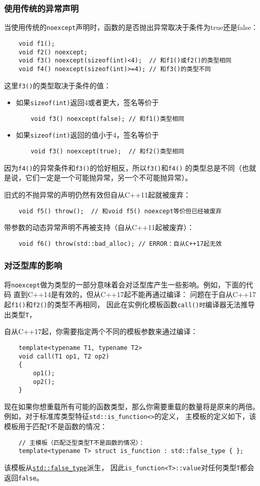 \subsubsection{使用传统的异常声明}
当使用传统的\texttt{noexcept}声明时，函数的是否抛出异常取决于条件为true还是false：
\begin{lstlisting}
    void f1();
    void f2() noexcept;
    void f3() noexcept(sizeof(int)<4);  // 和f1()或f2()的类型相同
    void f4() noexcept(sizeof(int)>=4); // 和f3()的类型不同
\end{lstlisting}
这里\texttt{f3()}的类型取决于条件的值：
\begin{itemize}
    \item 如果\texttt{sizeof(int)}返回4或者更大，签名等价于
    \begin{lstlisting}
    void f3() noexcept(false); // 和f1()类型相同
    \end{lstlisting}
    \item 如果\texttt{sizeof(int)}返回的值小于4，签名等价于
    \begin{lstlisting}
    void f3() noexcept(true);  // 和f2()类型相同
    \end{lstlisting}
\end{itemize}
因为\texttt{f4()}的异常条件和\texttt{f3()}的恰好相反，所以\texttt{f3()}和\texttt{f4()}
的类型总是不同（也就是说，它们一定是一个可能抛异常，另一个不可能抛异常）。

旧式的不抛异常的声明仍然有效但自从C++11起就被废弃：
\begin{lstlisting}
    void f5() throw();  // 和void f5() noexcept等价但已经被废弃
\end{lstlisting}
带参数的动态异常声明不再被支持（自从C++11起被废弃）：
\begin{lstlisting}
    void f6() throw(std::bad_alloc); // ERROR：自从C++17起无效
\end{lstlisting}

\subsubsection{对泛型库的影响}
将\texttt{noexcept}做为类型的一部分意味着会对泛型库产生一些影响。例如，下面的代码
直到C++14是有效的，但从C++17起不能再通过编译：
问题在于自从C++17起\texttt{f1()}和\texttt{f2()}的类型不再相同，
因此在实例化模板函数\texttt{call()时}编译器无法推导出类型\texttt{T}，

自从C++17起，你需要指定两个不同的模板参数来通过编译：
\begin{lstlisting}
    template<typename T1, typename T2>
    void call(T1 op1, T2 op2)
    {
        op1();
        op2();
    }
\end{lstlisting}
现在如果你想重载所有可能的函数类型，那么你需要重载的数量将是原来的两倍。
例如，对于标准库类型特征\texttt{std::is\_function<>}的定义，
主模板的定义如下，该模板用于匹配\texttt{T}不是函数的情况：
\begin{lstlisting}
    // 主模板（匹配泛型类型T不是函数的情况）：
    template<typename T> struct is_function : std::false_type { };
\end{lstlisting}
该模板从\hyperref[ch33.2]{\texttt{std::false\_type}}派生，
因此\texttt{is\_function<T>::value}对任何类型\texttt{T}都会返回\texttt{false}。

